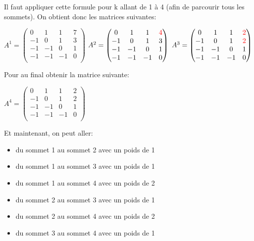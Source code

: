 Il faut appliquer cette formule pour k allant de 1 à 4 (afin de parcourir tous les sommets).
On obtient donc les matrices suivantes: \\
\begin{center}
$ A^1=
\begin{pmatrix} 
0 & 1 & 1 & 7 \\
-1 & 0 & 1 & 3 \\
-1 & -1 & 0 & 1 \\
-1 & -1 & -1 & 0 \\
\end{pmatrix}
$
$ A^2=
\begin{pmatrix} 
0 & 1 & 1 & \textcolor{red}{4} \\
-1 & 0 & 1 & 3 \\
-1 & -1 & 0 & 1 \\
-1 & -1 & -1 & 0 \\
\end{pmatrix}
$
$ A^3=
\begin{pmatrix} 
0 & 1 & 1 & \textcolor{red}{2} \\
-1 & 0 & 1 & \textcolor{red}{2} \\
-1 & -1 & 0 & 1 \\
-1 & -1 & -1 & 0 \\
\end{pmatrix}
$
\end{center}
Pour au final obtenir la matrice suivante:
\begin{center}
$ A^4=
\begin{pmatrix} 
0 & 1 & 1 & 2 \\
-1 & 0 & 1 & 2 \\
-1 & -1 & 0 & 1 \\
-1 & -1 & -1 & 0 \\
\end{pmatrix}
$
\end{center}
Et maintenant, on peut aller:
\begin{itemize}
\item du sommet 1 au sommet 2 avec un poids de 1
\item du sommet 1 au sommet 3 avec un poids de 1
\item du sommet 1 au sommet 4 avec un poids de 2
\item du sommet 2 au sommet 3 avec un poids de 1
\item du sommet 2 au sommet 4 avec un poids de 2
\item du sommet 3 au sommet 4 avec un poids de 1 \\
\end{itemize}
